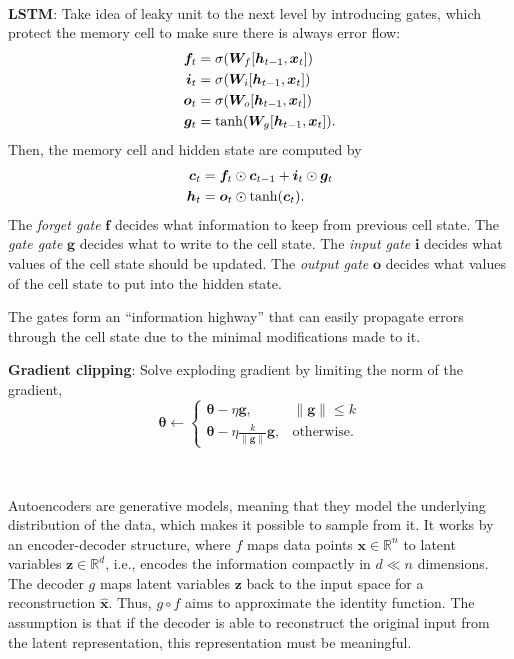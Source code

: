 \documentclass{article}
\newcommand{\lft}{\mathopen{}\mathclose\bgroup\left}
\newcommand{\rgt}{\aftergroup\egroup\right}
\newcommand{\R}{\mathbb{R}}
\renewcommand{\vec}[1]{\bm{#1}}
\newcommand{\mat}[1]{\bm{#1}}
\newenvironment{topic}[1]
{\textbf{\sffamily \colorbox{black}{\rlap{\textbf{\textcolor{white}{#1}}}\hspace{\linewidth}\hspace{-2\fboxsep}}} \\ \vspace{0.2cm}}
{}
\begin{document}
\begin{multicols*}{2}
\begin{topic}{Recurrent neural networks}
        \textbf{LSTM}: Take idea of leaky unit to the next level by introducing gates, which protect the memory cell to make sure there is always error flow:
        \begin{align*}
            \vec{f}_t & = \sigma \lft( \mat{W}_{f} [\vec{h}_{t-1}, \vec{x}_t] \rgt) \\
            \vec{i}_t & = \sigma \lft( \mat{W}_{i} [\vec{h}_{t-1}, \vec{x}_t] \rgt) \\
            \vec{o}_t & = \sigma \lft( \mat{W}_{o} [\vec{h}_{t-1}, \vec{x}_t] \rgt) \\
            \vec{g}_t & = \tanh \lft( \mat{W}_{g} [\vec{h}_{t-1}, \vec{x}_t] \rgt).
        \end{align*}
        Then, the memory cell and hidden state are computed by
        \begin{align*}
            \vec{c}_t & = \vec{f}_t \odot \vec{c}_{t-1} + \vec{i}_t \odot \vec{g}_t \\
            \vec{h}_t & = \vec{o}_t \odot \tanh \lft( \vec{c}_t \rgt).
        \end{align*}
        The \textit{forget gate} $\vec{f}$ decides what information to keep from previous cell state. The \textit{gate
            gate} $\vec{g}$ decides what to write to the cell state. The \textit{input gate} $\vec{i}$ decides what
        values of the cell state should be updated. The \textit{output gate} $\vec{o}$ decides what values of
        the cell state to put into the hidden state.

        The gates form an ``information highway'' that can easily propagate errors through the cell state
        due to the minimal modifications made to it.

        \textbf{Gradient clipping}: Solve exploding gradient by limiting the norm of the gradient, \[
            \vec{\theta} \gets \begin{cases}
                \vec{\theta} - \eta \vec{g},                         & \| \vec{g} \| \leq k \\
                \vec{\theta} - \eta \frac{k}{\| \vec{g} \|} \vec{g}, & \text{otherwise}.
            \end{cases}
        \]

    \end{topic}

    \begin{topic}{Autoencoders}

        Autoencoders are generative models, meaning that they model the underlying distribution of the
        data, which makes it possible to sample from it. It works by an encoder-decoder structure, where
        $f$ maps data points $\vec{x} \in \R^n$ to latent variables $\vec{z} \in \R^d$, i.e., encodes the
        information compactly in $d \ll n$ dimensions. The decoder $g$ maps latent variables $\vec{z}$ back
        to the input space for a reconstruction $\hat{\vec{x}}$. Thus, $g \circ f$ aims to approximate the
        identity function. The assumption is that if the decoder is able to reconstruct the original input
        from the latent representation, this representation must be meaningful.


\end{topic}
\end{multicols*}
\end{document}
